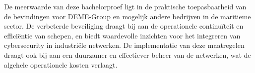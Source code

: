De meerwaarde van deze bachelorproef ligt in de praktische toepasbaarheid van de bevindingen voor DEME-Group en mogelijk 
andere bedrijven in de maritieme sector. De verbeterde beveiliging draagt bij aan de operationele continuïteit en efficiëntie 
van schepen, en biedt waardevolle inzichten voor het integreren van cybersecurity in industriële netwerken. De implementatie 
van deze maatregelen draagt ook bij aan een duurzamer en effectiever beheer van de netwerken, wat de algehele operationele kosten 
verlaagt.


